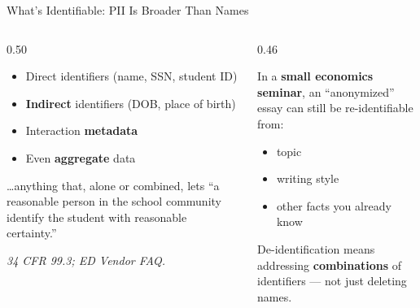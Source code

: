 \documentclass[aspectratio=169, 10pt]{beamer}
\newcommand{\cmcite}[1]{{\scriptsize\color{CoolGray}\textit{#1}}}
\begin{document}
\begin{frame}{What's Identifiable: PII Is Broader Than Names}
\begin{columns}[T]
\begin{column}{0.50\textwidth}
\begin{tcolorbox}[keybox, title={\faIdCard\quad FERPA's PII includes\ldots}]
\small
\begin{itemize}\setlength{\itemsep}{2pt}
  \item Direct identifiers (name, SSN, student ID)
  \item \textbf{Indirect} identifiers (DOB, place of birth)
  \item Interaction \textbf{metadata}
  \item Even \textbf{aggregate} data
\end{itemize}
\vskip3pt
\footnotesize \ldots anything that, alone or combined, lets ``a reasonable person in the school community identify the student with reasonable certainty.''
\end{tcolorbox}
\vskip3pt
\cmcite{34 CFR 99.3; ED Vendor FAQ.}
\end{column}
\begin{column}{0.46\textwidth}
\begin{tcolorbox}[coralbox, title={\faExclamationTriangle\quad The mosaic effect}]
\small
In a \textbf{small economics seminar}, an ``anonymized'' essay can still be re-identifiable from:
\vskip3pt
\begin{itemize}\setlength{\itemsep}{1pt}
  \item topic
  \item writing style
  \item other facts you already know
\end{itemize}
\vskip3pt
De-identification means addressing \textbf{combinations} of identifiers --- not just deleting names.
\end{tcolorbox}
\end{column}
\end{columns}
\end{frame}
\end{document}
